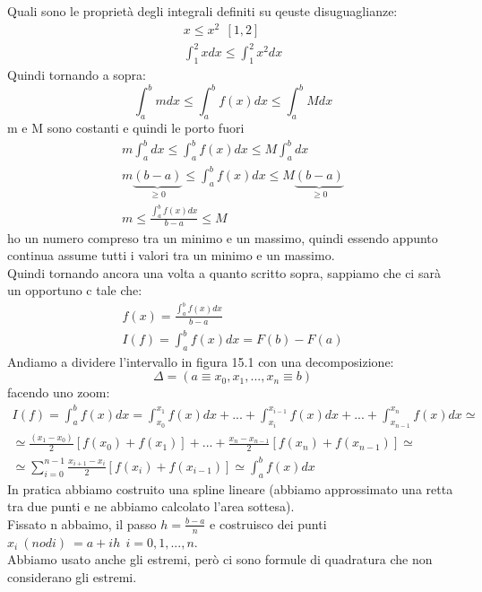 \documentclass[a4paper, portrait]{book}
\numberwithin{equation}{chapter} %
\begin{document}
Quali sono le proprietà degli integrali definiti su qeuste disuguaglianze:
\begin{gather}
    x\leq x^2 \ \ [1,2]\\
    \int_1^2 x dx \leq \int_1^2 x^2 dx
\end{gather}
Quindi tornando a sopra:
\begin{equation}
    \int_a^b m dx \leq \int_a^b f(x) dx \leq \int_a^b M dx
\end{equation}
m e M sono costanti e quindi le porto fuori
\begin{gather}
    m\int_a^b dx \leq \int_a^b f(x) dx \leq M\int_a^b dx\\
    m\underbrace{(b-a)}_{\geq 0} \leq \int_a^b f(x) dx \leq M\underbrace{(b-a)}_{\geq 0}\\
    m\leq \frac{\int_a^b f(x) dx}{b-a} \leq M
\end{gather}
ho un numero compreso tra un minimo e un massimo, quindi essendo appunto continua assume tutti i valori tra un minimo e un massimo.\\
Quindi tornando ancora una volta a quanto scritto sopra, sappiamo che ci sarà un opportuno c tale che:
\begin{gather}
    f(x) = \frac{\int_a^b f(x) dx}{b-a}\\
    I(f) = \int_a^b f(x) dx = F(b) - F(a)
\end{gather}
Andiamo a dividere l'intervallo in figura 15.1 con una decomposizione:
\begin{equation}
    \Delta = (a\equiv x_0,x_1,...,x_n\equiv b)
\end{equation}
facendo uno zoom:
\begin{gather}
    I(f) = \int_a^b f(x) dx = \int_{x_0}^{x_1} f(x) dx + ... + \int_{x_i}^{x_{i-1}}f(x) dx + ... + \int_{x_{n-1}}^{x_n}f(x) dx \simeq\\
    \simeq \frac{(x_1 - x_0)}{2}\left[f(x_0) + f(x_1)\right] + ... + \frac{x_n - x_{n-1}}{2}\left[f(x_n)+f(x_{n-1})\right] \simeq \\
    \simeq \sum_{i=0}^{n-1}\frac{x_{i+1}-x_{i}}{2} \left[f(x_i)+f(x_{i-1})\right]\simeq \int_a^b f(x) dx
\end{gather}
In pratica abbiamo costruito una spline lineare (abbiamo approssimato una retta tra due punti e ne abbiamo calcolato l'area sottesa).\\
Fissato n abbaimo, il passo $h = \frac{b-a}{n}$ e costruisco dei punti $x_i \ (nodi) \ = a+ih \ \ i = 0,1,...,n$.\\
Abbiamo usato anche gli estremi, però ci sono formule di quadratura che non considerano gli estremi.
\end{document}
